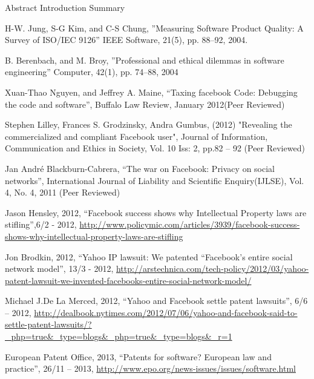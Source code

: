 \documentclass[conference]{IEEEtran}
\begin{document}
Abstract
Introduction
Summary
\begin{thebibliography}{1}

H-W. Jung, S-G Kim, and C-S Chung, ''Measuring Software Product Quality: A
Survey of ISO/IEC 9126'' IEEE Software, 21(5), pp. 88--92, 2004.

B. Berenbach, and M. Broy, ''Professional and ethical dilemmas in software
engineering'' Computer, 42(1), pp. 74--88, 2004

Xuan-Thao Nguyen, and Jeffrey A. Maine, “Taxing facebook Code: Debugging the
code and software”, Buffalo Law Review, January 2012(Peer Reviewed)

Stephen Lilley, Frances S. Grodzinsky, Andra Gumbus, (2012) "Revealing the
commercialized and compliant Facebook user", Journal of Information,
Communication and Ethics in Society, Vol. 10 Iss: 2, pp.82 – 92 (Peer Reviewed)

Jan André Blackburn-Cabrera, “The war on Facebook: Privacy on social networks”,
International Journal of Liability and Scientific Enquiry(IJLSE), Vol. 4, No.
4, 2011 (Peer Reviewed)

Jason Hensley, 2012, “Facebook success shows why Intellectual Property laws are
stifling”,6/2 - 2012,
\href{http://www.policymic.com/articles/3939/facebook-success-shows-why-intellectual-property-laws-are-stifling}{http://www.policymic.com/articles/3939/facebook-success-shows-why-intellectual-property-laws-are-stifling}

Jon Brodkin,  2012, “Yahoo IP lawsuit: We patented “Facebook’s entire social
network model”, 13/3 - 2012,
\href{http://arstechnica.com/tech-policy/2012/03/yahoo-patent-lawsuit-we-invented-facebooks-entire-social-network-model/}{http://arstechnica.com/tech-policy/2012/03/yahoo-patent-lawsuit-we-invented-facebooks-entire-social-network-model/}

Michael J.De La Merced, 2012, “Yahoo and Facebook settle patent lawsuits”, 6/6
– 2012,
\href{http://dealbook.nytimes.com/2012/07/06/yahoo-and-facebook-said-to-settle-patent-lawsuits/?\_php=true\&\_type=blogs\&\_php=true\&\_type=blogs\&\_r=1}{http://dealbook.nytimes.com/2012/07/06/yahoo-and-facebook-said-to-settle-patent-lawsuits/?\_php=true\&\_type=blogs\&\_php=true\&\_type=blogs\&\_r=1}

European Patent Office, 2013, “Patents for software? European law and
practice”, 26/11 – 2013, \href{http://www.epo.org/news-issues/issues/software.html}{http://www.epo.org/news-issues/issues/software.html}


\end{thebibliography}
\end{document}
